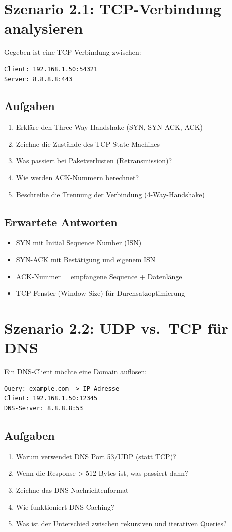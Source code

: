 \documentclass[12pt,a4paper,german]{report}
\begin{document}
\section{Szenario 2.1: TCP-Verbindung analysieren}

Gegeben ist eine TCP-Verbindung zwischen:
\begin{lstlisting}
Client: 192.168.1.50:54321
Server: 8.8.8.8:443
\end{lstlisting}

\subsection{Aufgaben}
\begin{enumerate}
    \item Erkläre den Three-Way-Handshake (SYN, SYN-ACK, ACK)
    \item Zeichne die Zustände des TCP-State-Machines
    \item Was passiert bei Paketverlusten (Retransmission)?
    \item Wie werden ACK-Nummern berechnet?
    \item Beschreibe die Trennung der Verbindung (4-Way-Handshake)
\end{enumerate}

\subsection{Erwartete Antworten}
\begin{itemize}
    \item SYN mit Initial Sequence Number (ISN)
    \item SYN-ACK mit Bestätigung und eigenem ISN
    \item ACK-Nummer = empfangene Sequence + Datenlänge
    \item TCP-Fenster (Window Size) für Durchsatzoptimierung
\end{itemize}

\section{Szenario 2.2: UDP vs.\ TCP für DNS}

Ein DNS-Client möchte eine Domain auflösen:
\begin{lstlisting}
Query: example.com -> IP-Adresse
Client: 192.168.1.50:12345
DNS-Server: 8.8.8.8:53
\end{lstlisting}

\subsection{Aufgaben}
\begin{enumerate}
    \item Warum verwendet DNS Port 53/UDP (statt TCP)?
    \item Wenn die Response > 512 Bytes ist, was passiert dann?
    \item Zeichne das DNS-Nachrichtenformat
    \item Wie funktioniert DNS-Caching?
    \item Was ist der Unterschied zwischen rekursiven und iterativen Queries?
\end{enumerate}
\end{document}
